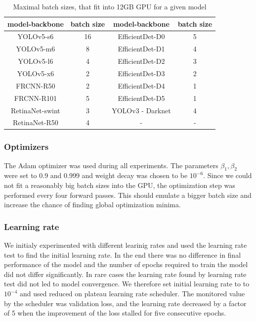 \begin{table}
    \centering
    \begin{tabular}{|c|c|c|c|}
        \hline
        model-backbone  & batch size & model-backbone   & batch size \\ \hline
        YOLOv5-s6       & 16         & EfficientDet-D0  & 5          \\ \hline
        YOLOv5-m6       & 8          & EfficientDet-D1  & 4          \\ \hline
        YOLOv5-l6       & 4          & EfficientDet-D2  & 3          \\ \hline
        YOLOv5-x6       & 2          & EfficientDet-D3  & 2          \\ \hline
        FRCNN-R50       & 2          & EfficientDet-D4  & 1          \\ \hline
        FRCNN-R101      & 5          & EfficientDet-D5  & 1          \\ \hline
        RetinaNet-swint & 3          & YOLOv3 - Darknet & 4          \\ \hline
        RetinaNet-R50   & 4          & -                & -          \\ \hline
    \end{tabular}
    \caption{Maximal batch sizes, that fit into 12GB GPU for a given model}
    \label{tab:batch_sizes}
\end{table}

\subsubsection{Optimizers}
The Adam optimizer was used during all experiments. The parameters $\beta_1, \beta_2$ were set to 0.9 and 0.999 and weight decay was chosen to be $10^{-6}$. Since we could not fit a reasonably big batch sizes into the GPU, the optimization step was performed every four forward passes. This should emulate a bigger batch size and increase the chance of finding global optimization minima.

\subsubsection{Learning rate}
We initialy experimented with different learinig rates and used the learning rate test to find the initial learning rate. In the end there was no difference in final performance of the model and the number of epochs required to train the model did not differ significantly. In rare cases the learning rate found by learning rate test did not led to model convergence. We therefore set initial learning rate to to $10^{-4}$ and used reduced on plateau learning rate scheduler. The monitored value by the scheduler was validation loss, and the learning rate decreased by a factor of 5 when the improvement of the loss stalled for five consecutive epochs.
